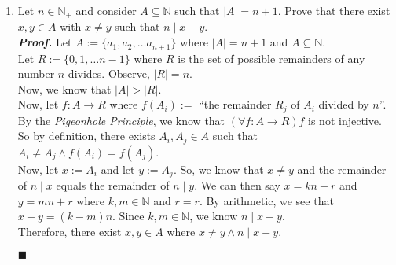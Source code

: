 \documentclass[11pt,a4paper]{article}
\begin{document}
\begin{enumerate}
    \item 
    Let $n \in \mathbb{N}_+ $ and consider $A \subseteq \mathbb{N} $ such that $|A| = n + 1$. Prove that there exist $x, y \in A  $ with $x \neq y$ such that $n \mid x - y  $. \\
    \emph{\textbf{Proof.}} Let $A := \{a_1, a_2, \dots a_{n+1} \} $ where $|A| = n + 1 $ and $A \subseteq \mathbb{N} $. \\
    Let $R := \{0, 1, \dots n - 1 \} $ where $R$ is the set of possible remainders of any number $n$ divides. Observe, $|R| = n$. \\
    Now, we know that $|A| > |R| $. \\
    Now, let $f: A \rightarrow R $ where $f(A_i) :=  $ ``the remainder $R_j$ of $A_i$ divided by $n$''. \\
    By the \emph{Pigeonhole Principle}, we know that $(\forall f: A \rightarrow R) f $ is not injective. 
    So by definition, there exists $A_i, A_j \in A $ such that $A_i \neq A_j \land f(A_i) = f(A_j) $. \\
    Now, let $x := A_i $ and let $y := A_j $. So, we know that $x \neq y$ and the remainder of $n \mid x$ equals the remainder of $n \mid y$.
    We can then say $x = kn + r $ and $y = mn + r $ where $k, m \in \mathbb{N} $ and $r = r $. By arithmetic, we see that $x - y = (k - m)n  $.
    Since $k, m \in \mathbb{N} $, we know $n \mid x - y $. \\
    Therefore, there exist $x, y \in A $ where $x \neq y \land n \mid x - y$.
    \begin{flushright}
        $\blacksquare$
    \end{flushright}


\end{enumerate}
\end{document}
